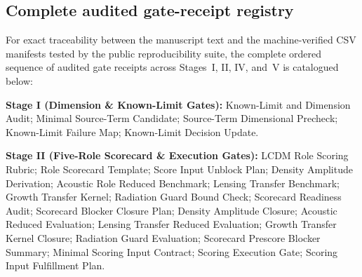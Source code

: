 \documentclass[11pt]{article}
\begin{document}
\subsection{Complete audited gate-receipt registry}
\label{sec:audited-gate-registry}

For exact traceability between the manuscript text and the machine-verified CSV
manifests tested by the public reproducibility suite, the complete ordered
sequence of audited gate receipts across Stages~I, II, IV, and~V is catalogued
below:

\medskip
\begingroup\footnotesize\raggedright
\noindent\textbf{Stage I (Dimension \& Known-Limit Gates):}
Known-Limit and Dimension Audit;
Minimal Source-Term Candidate;
Source-Term Dimensional Precheck;
Known-Limit Failure Map;
Known-Limit Decision Update.

\smallskip\noindent\textbf{Stage II (Five-Role Scorecard \& Execution Gates):}
LCDM Role Scoring Rubric;
Role Scorecard Template;
Score Input Unblock Plan;
Density Amplitude Derivation;
Acoustic Role Reduced Benchmark;
Lensing Transfer Benchmark;
Growth Transfer Kernel;
Radiation Guard Bound Check;
Scorecard Readiness Audit;
Scorecard Blocker Closure Plan;
Density Amplitude Closure;
Acoustic Reduced Evaluation;
Lensing Transfer Reduced Evaluation;
Growth Transfer Kernel Closure;
Radiation Guard Evaluation;
Scorecard Prescore Blocker Summary;
Minimal Scoring Input Contract;
Scoring Execution Gate;
Scoring Input Fulfillment Plan.
\end{document}
